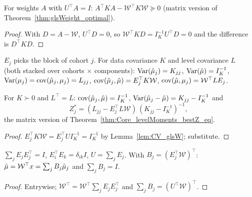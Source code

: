 \begin{theorem}\label{thm:CV_glsW_optimal}
  \leanok
  For weights $A$ with $U^\top A = I$:
  $A^\top K A - \mathcal W^\top K \mathcal W \succeq 0$ (matrix version of
  Theorem~\ref{thm:glsWeight_optimal}).
\end{theorem}
\begin{proof}
  \leanok
  With $D = A - \mathcal W$, $U^\top D = 0$, so
  $\mathcal W^\top K D = I_K^{-1}U^\top D = 0$ and the difference is $D^\top K D$.
\end{proof}

\begin{definition}\label{def:CV_moments}
  \leanok
  $E_j$ picks the block of cohort $j$. For data covariance $K$ and level
  covariance $L$ (both stacked over cohorts $\times$ components):
  $\mathrm{Var}(\hat\mu_j) = K_{jj}$, $\mathrm{Var}(\hat\mu) = I_K^{-1}$,
  $\mathrm{Var}(\mu_j) = \mathrm{cov}(\hat\mu_j, \mu_j) = L_{jj}$,
  $\mathrm{cov}(\hat\mu_j, \hat\mu) = E_j^\top K\mathcal W$,
  $\mathrm{cov}(\hat\mu, \mu_j) = \mathcal W^\top L E_j$.
\end{definition}

\begin{theorem}[Matrix eq.\ (26)]\label{thm:CV_bestZ}
  \leanok
  For $K \succ 0$ and $L^\top = L$: $\mathrm{cov}(\hat\mu_j, \hat\mu) = I_K^{-1}$,
  $\mathrm{Var}(\hat\mu_j - \hat\mu) = K_{jj} - I_K^{-1}$ and
  \[ Z_j^\ast = (L_{jj} - E_j^\top L\mathcal W)\,(K_{jj} - I_K^{-1})^{-1}, \]
  the matrix version of Theorem~\ref{thm:Core_levelMoments_bestZ_eq}.
\end{theorem}
\begin{proof}
  \leanok
  $E_j^\top K\mathcal W = E_j^\top U I_K^{-1} = I_K^{-1}$ by Lemma~\ref{lem:CV_glsW}; substitute.
\end{proof}

\begin{lemma}\label{lem:CV_weight}
  \leanok
  $\sum_j E_jE_j^\top = I$, $E_i^\top E_k = \delta_{ik} I$, $U = \sum_j E_j$. With
  $B_j = (E_j^\top\mathcal W)^\top$: $\hat\mu = \mathcal W^\top x = \sum_j B_j\hat\mu_j$ and
  $\sum_j B_j = I$.
\end{lemma}
\begin{proof}
  \leanok
  Entrywise; $\mathcal W^\top = \mathcal W^\top\sum_j E_jE_j^\top$ and
  $\sum_j B_j = (U^\top\mathcal W)^\top$.
\end{proof}

